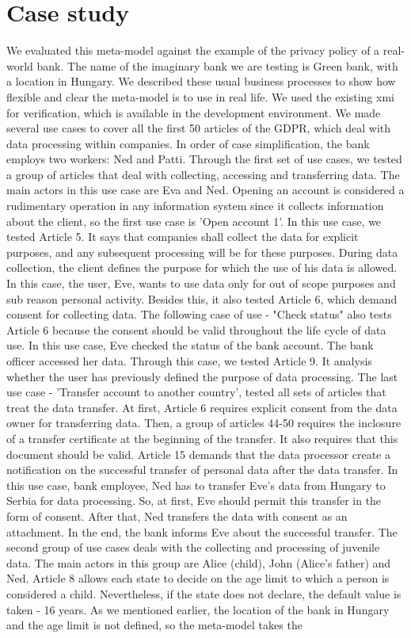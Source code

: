 \documentclass[11pt,english]{article}
\begin{document}
\section{Case study}
We evaluated this meta-model against the example of the privacy policy of a real-world bank. The name of the imaginary bank we are testing is Green bank, with a location in Hungary. We described these usual business processes to show how flexible and clear the meta-model is to use in real life. We used the existing xmi for verification, which is available in the development environment. We made several use cases to cover all the first 50 articles of the GDPR, which deal with data processing within companies. In order of case simplification, the bank employs two workers: Ned and Patti. \newline Through the first set of use cases, we tested a group of articles that deal with collecting, accessing and transferring data. The main actors in this use case are Eva and Ned. Opening an account is considered a rudimentary operation in any information system since it collects information about the client, so the first use case is 'Open account 1'. In this use case, we tested Article 5. It says that companies shall collect the data for explicit purposes, and any subsequent processing will be for these purposes. During data collection, the client defines the purpose for which the use of his data is allowed. In this case, the user, Eve, wants to use data only for out of scope purposes and sub reason personal activity. Besides this, it also tested Article 6, which demand consent for collecting data. The following case of use - "Check status" also tests Article 6 because the consent should be valid throughout the life cycle of data use. In this use case, Eve checked the status of the bank account. The bank officer accessed her data. Through this case, we tested Article 9. It analysis whether the user has previously defined the purpose of data processing. The last use case - 'Transfer account to another country', tested all sets of articles that treat the data transfer. At first, Article 6 requires explicit consent from the data owner for transferring data. Then, a group of articles 44-50 requires the inclosure of a transfer certificate at the beginning of the transfer. It also requires that this document should be valid. Article 15 demands that the data processor create a notification on the successful transfer of personal data after the data transfer. In this use case, bank employee, Ned has to transfer Eve's data from Hungary to Serbia for data processing. So, at first, Eve should permit this transfer in the form of consent. After that, Ned transfers the data with consent as an attachment. In the end, the bank informs Eve about the successful transfer. \newline The second group of use cases deals with the collecting and processing of juvenile data. The main actors in this group are Alice (child), John (Alice's father) and Ned. Article 8 allows each state to decide on the age limit to which a person is considered a child. Nevertheless, if the state does not declare, the default value is taken - 16 years. As we mentioned earlier, the location of the bank in Hungary and the age limit is not defined, so the meta-model takes the 
\end{document}
